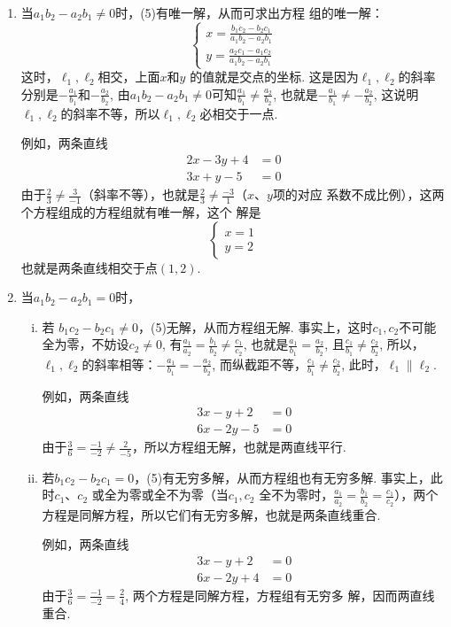 \begin{enumerate}
    \item 当$a_1b_2-a_2b_1\neq0$时，(5)有唯一解，从而可求出方程
组的唯一解：
\[\begin{cases}
    x=\frac{b_1c_2-b_2c_1}{a_1b_2-a_2b_1}\\
    y=\frac{a_2c_1-a_1c_2}{a_1b_2-a_2b_1}
\end{cases}\]
这时，$\ell_1,\ell_2$相交，上面$x$和$y$ 的值就是交点的坐标. 这是因为$\ell_1,\ell_2$的斜率分别是$-\frac {a_1}{b_1}$和$-\frac{a_2}{b_2}$, 由$a_1b_2-a_2b_1\neq0$可知$\frac{a_1}{b_1}\neq\frac{a_2}{b_2}$, 也就是$-\frac {a_1}{b_1}\neq-\frac{a_2}{b_2}$, 这说明$\ell_1,\ell_2$的斜率不等，所以$\ell_1,\ell_2$必相交于一点.

例如，两条直线
\[\begin{split}
    2x-3y+4&=0\\
    3x+y-5&=0
\end{split}\]
由于$\frac23\neq\frac3{-1}$（斜率不等），也就是$\frac23\neq\frac{-3}1$（$x$、$y$项的对应
系数不成比例），这两个方程组成的方程组就有唯一解，这个
解是
$$\begin{cases}x=1\\y=2\end{cases}$$
也就是两条直线相交于点$(1,2)$.

\item 当$a_1b_2-a_2b_1=0$时，
\begin{enumerate}[(i)]
    \item  若 $b_1c_2-b_2c_1\neq0$，(5)无解，从而方程组无解. 事实上，这时$c_1,c_2$不可能全为零，不妨设$c_2\neq0$, 有$\frac {a_1}{a_2}=\frac{b_1}{b_2}\neq\frac{c_1}{c_2}$, 也就是$\frac{a_1}{b_1}=\frac{a_2}{b_2}$, 且$\frac {c_1}{b_1}\neq\frac{c_2}{b_2}$, 所以，$\ell_1,\ell_2$的斜率相等：$-\frac{a_1}{b_1}=-\frac{a_2}{b_2}$, 
而纵截距不等，$\frac{c_1}{b_1}\neq\frac{c_2}{b_2}$, 此时，$\ell_1\parallel \ell_2$.

例如，两条直线
\[\begin{split}
    3x-y+2&=0\\6x-2y-5&=0
\end{split}\]
由于$\frac{3}{6}=\frac{-1}{-2}\ne\frac{2}{-5}$，所以方程组无解，也就是两直线平行.
\item 若$b_1c_2-b_2c_1=0$，(5)有无穷多解，从而方程组也有无穷多解. 事实上，此时$c_1$、$c_2$ 或全为零或全不为零（当$c_1,c_2$ 全不为零时，$\frac{a_1}{a_2}=\frac{b_1}{b_2}=\frac{c_1}{c_2}$），两个方程是同解方程，所以它们有无穷多解，也就是两条直线重合.

例如，两条直线
\[\begin{split}
    3x-y+2&=0\\
    6x-2y+4&=0
\end{split}\]
由于$\frac{3}{6}=\frac{-1}{-2}=\frac{2}{4}$, 两个方程是同解方程，方程组有无穷多
解，因而两直线重合.
\end{enumerate}
\end{enumerate}

